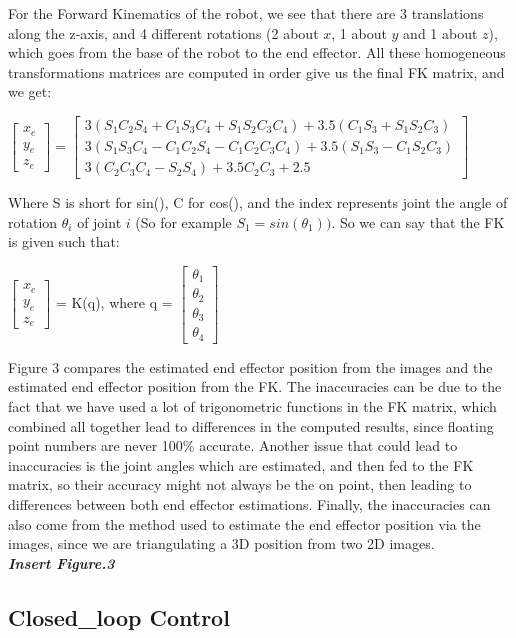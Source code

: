 \documentclass{article}
\begin{document}
For the Forward Kinematics of the robot, we see that there are 3 translations along the z-axis, and 4 different rotations (2 about $x$, 1 about $y$ and 1 about $z$), which goes from the base of the robot to the end effector. All these homogeneous transformations matrices  are computed in order give us the final FK matrix, and we get: \\
\begin{center}
    $\begin{bmatrix}
        x_e\\
        y_e\\
        z_e
    \end{bmatrix} 
    = 
    \begin{bmatrix}
        3(S_1C_2S_4 + C_1S_3C_4 + S_1S_2C_3C_4) + 3.5(C_1S_3 + S_1S_2C_3)\\
        3(S_1S_3C_4 - C_1C_2S_4 - C_1C_2C_3C_4) + 3.5(S_1S_3 - C_1S_2C_3)\\
        3(C_2C_3C_4 - S_2S_4) + 3.5C_2C_3 + 2.5
    \end{bmatrix}
    $
\end{center}

Where S is short for sin(), C for cos(), and the index represents joint the angle of rotation $\theta_i$ of joint $i$ (So for example $S_1 = sin(\theta_1))$. So we can say that the FK is given such that: \\ 
\begin{center}
    $\begin{bmatrix}
        x_e\\
        y_e\\
        z_e
    \end{bmatrix}$ 
    = K(q), where q = 
    $\begin{bmatrix}
        \theta_1 \\
        \theta_2 \\
        \theta_3 \\
        \theta_4
    \end{bmatrix}
    $
\end{center}

Figure 3 compares the estimated end effector position from the images and the estimated end effector position from the FK. The inaccuracies can be due to the fact that we have used a lot of trigonometric functions in the FK matrix, which combined all together lead to differences in the computed results, since floating point numbers are never 100\% accurate. Another issue that could lead to inaccuracies is the joint angles which are estimated, and then fed to the FK matrix, so their accuracy might not always be the on point, then leading to differences between both end effector estimations. Finally, the inaccuracies can also come from the method used to estimate the end effector position via the images, since we are triangulating a 3D position from two 2D images. \\

\textbf{\textit{Insert Figure.3}}

\subsection{Closed\_loop Control}
\end{document}
